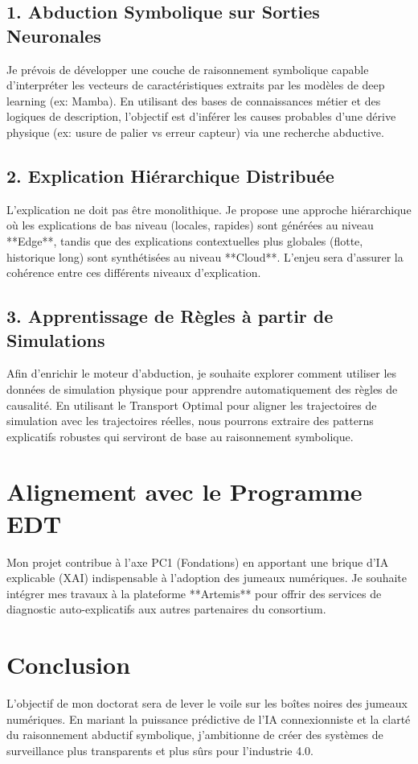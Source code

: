 \documentclass[11pt,a4paper]{article}
\begin{document}
\subsection{1. Abduction Symbolique sur Sorties Neuronales}
Je prévois de développer une couche de raisonnement symbolique capable d'interpréter les vecteurs de caractéristiques extraits par les modèles de deep learning (ex: Mamba). En utilisant des bases de connaissances métier et des logiques de description, l'objectif est d'inférer les causes probables d'une dérive physique (ex: usure de palier vs erreur capteur) via une recherche abductive.

\subsection{2. Explication Hiérarchique Distribuée}
L'explication ne doit pas être monolithique. Je propose une approche hiérarchique où les explications de bas niveau (locales, rapides) sont générées au niveau **Edge**, tandis que des explications contextuelles plus globales (flotte, historique long) sont synthétisées au niveau **Cloud**. L'enjeu sera d'assurer la cohérence entre ces différents niveaux d'explication.

\subsection{3. Apprentissage de Règles à partir de Simulations}
Afin d'enrichir le moteur d'abduction, je souhaite explorer comment utiliser les données de simulation physique pour apprendre automatiquement des règles de causalité. En utilisant le Transport Optimal pour aligner les trajectoires de simulation avec les trajectoires réelles, nous pourrons extraire des patterns explicatifs robustes qui serviront de base au raisonnement symbolique.

\section{Alignement avec le Programme EDT}
Mon projet contribue à l'axe PC1 (Fondations) en apportant une brique d'IA explicable (XAI) indispensable à l'adoption des jumeaux numériques. Je souhaite intégrer mes travaux à la plateforme **Artemis** pour offrir des services de diagnostic auto-explicatifs aux autres partenaires du consortium.

\section{Conclusion}
L'objectif de mon doctorat sera de lever le voile sur les boîtes noires des jumeaux numériques. En mariant la puissance prédictive de l'IA connexionniste et la clarté du raisonnement abductif symbolique, j'ambitionne de créer des systèmes de surveillance plus transparents et plus sûrs pour l'industrie 4.0.
\end{document}
